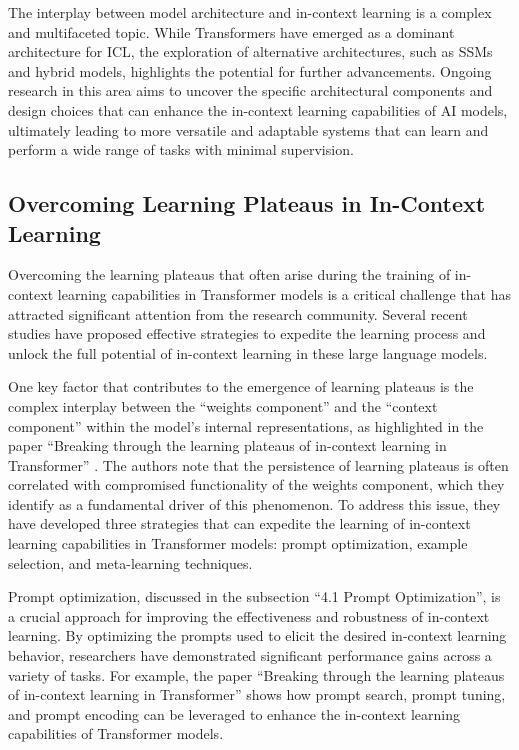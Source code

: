 \documentclass[11pt]{article}
\begin{document}
The interplay between model architecture and in-context learning is a complex and multifaceted topic. While Transformers have emerged as a dominant architecture for ICL, the exploration of alternative architectures, such as SSMs and hybrid models, highlights the potential for further advancements. Ongoing research in this area aims to uncover the specific architectural components and design choices that can enhance the in-context learning capabilities of AI models, ultimately leading to more versatile and adaptable systems that can learn and perform a wide range of tasks with minimal supervision.

\subsection{Overcoming Learning Plateaus in In-Context Learning}

Overcoming the learning plateaus that often arise during the training of in-context learning capabilities in Transformer models is a critical challenge that has attracted significant attention from the research community. Several recent studies have proposed effective strategies to expedite the learning process and unlock the full potential of in-context learning in these large language models.

One key factor that contributes to the emergence of learning plateaus is the complex interplay between the ``weights component'' and the ``context component'' within the model's internal representations, as highlighted in the paper ``Breaking through the learning plateaus of in-context learning in Transformer'' \cite{ref5}. The authors note that the persistence of learning plateaus is often correlated with compromised functionality of the weights component, which they identify as a fundamental driver of this phenomenon. To address this issue, they have developed three strategies that can expedite the learning of in-context learning capabilities in Transformer models: prompt optimization, example selection, and meta-learning techniques.

Prompt optimization, discussed in the subsection ``4.1 Prompt Optimization'', is a crucial approach for improving the effectiveness and robustness of in-context learning. By optimizing the prompts used to elicit the desired in-context learning behavior, researchers have demonstrated significant performance gains across a variety of tasks. For example, the paper ``Breaking through the learning plateaus of in-context learning in Transformer'' \cite{ref5} shows how prompt search, prompt tuning, and prompt encoding can be leveraged to enhance the in-context learning capabilities of Transformer models.
\end{document}
